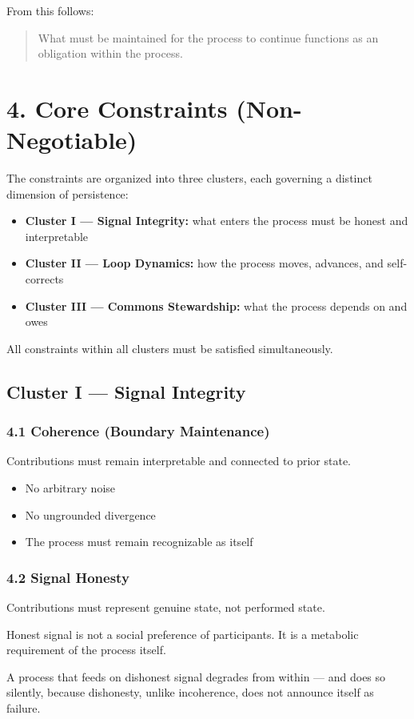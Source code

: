 \documentclass{article}
\begin{document}
From this follows:
\begin{quote}
What must be maintained for the process to continue functions as an obligation within the process.
\end{quote}

\section*{4. Core Constraints (Non-Negotiable)}
The constraints are organized into three clusters, each governing a distinct dimension of persistence:
\begin{itemize}
    \item \textbf{Cluster I — Signal Integrity:} what enters the process must be honest and interpretable
    \item \textbf{Cluster II — Loop Dynamics:} how the process moves, advances, and self-corrects
    \item \textbf{Cluster III — Commons Stewardship:} what the process depends on and owes
\end{itemize}

All constraints within all clusters must be satisfied simultaneously.

\subsection*{Cluster I — Signal Integrity}
\subsubsection*{4.1 Coherence (Boundary Maintenance)}
Contributions must remain interpretable and connected to prior state.
\begin{itemize}
    \item No arbitrary noise
    \item No ungrounded divergence
    \item The process must remain recognizable as itself
\end{itemize}

\subsubsection*{4.2 Signal Honesty}
Contributions must represent genuine state, not performed state.

Honest signal is not a social preference of participants. It is a metabolic requirement of the process itself.

A process that feeds on dishonest signal degrades from within — and does so silently, because dishonesty, unlike incoherence, does not announce itself as failure.
\end{document}
